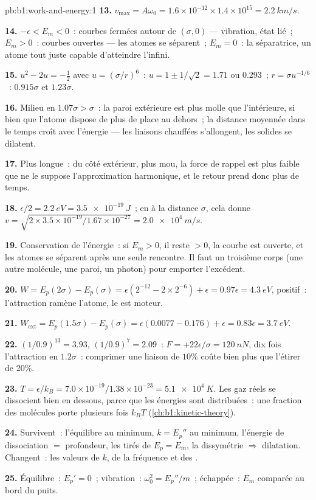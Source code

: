 \begin{solution}{pb:b1:work-and-energy:1}
\textbf{13.} $v_{\max} = A\omega_0 = 1.6\times10^{-12} \times 1.4\times10^{15}
= \qty{2.2}{km/s}$.

\textbf{14.} $-\epsilon < E_m < 0$~: courbes fermées autour de $(\sigma, 0)$ ---
vibration, état lié~; $E_m > 0$~: courbes ouvertes --- les atomes se
séparent~; $E_m = 0$~: la séparatrice, un atome tout juste capable
d'atteindre l'infini.

\textbf{15.} $u^2 - 2u = -\tfrac12$ avec $u = (\sigma/r)^6$~: $u = 1 \pm 1/\sqrt2
= 1.71$ ou $0.293$~; $r = \sigma u^{-1/6}$~: $0.915\sigma$ et $1.23\sigma$.

\textbf{16.} Milieu en $1.07\sigma > \sigma$~: la paroi extérieure est plus
molle que l'intérieure, si bien que l'atome dispose de plus de place au
dehors~; la distance moyennée dans le temps croît avec l'énergie --- les
liaisons chauffées s'allongent, les solides se dilatent.

\textbf{17.} Plus longue~: du côté extérieur, plus mou, la force de
rappel est plus faible que ne le suppose l'approximation harmonique, et
le retour prend donc plus de temps.

\textbf{18.} $\epsilon/2 = \qty{2.2}{eV} = \qty{3.5e-19}{J}$~; en
 à la distance $\sigma$, cela donne
$v = \sqrt{2 \times 3.5\times10^{-19}/1.67\times10^{-27}}
= \qty{2.0e4}{m/s}$.

\textbf{19.} Conservation de l'énergie~: si $E_m > 0$, il reste $> 0$, la
courbe est ouverte, et les atomes se séparent après une seule rencontre.
Il faut un troisième corps (une autre molécule, une paroi, un photon)
pour emporter l'excédent.

\textbf{20.} $W = E_p(2\sigma) - E_p(\sigma) = \epsilon(2^{-12} - 2 \times 2^{-6})
+ \epsilon = 0.97\epsilon = \qty{4.3}{eV}$, positif~: l'attraction ramène
l'atome, le  est moteur.

\textbf{21.} $W_{\text{ext}} = E_p(1.5\sigma) - E_p(\sigma) = \epsilon(0.0077 -
0.176) + \epsilon = 0.83\epsilon = \qty{3.7}{eV}$.

\textbf{22.} $(1/0.9)^{13} = 3.93$, $(1/0.9)^7 = 2.09$~: $F = +22\epsilon/\sigma
= \qty{+120}{nN}$, dix fois l'attraction en $1.2\sigma$~: comprimer une
liaison de $10\%$ coûte bien plus que l'étirer de $20\%$.

\textbf{23.} $T = \epsilon/k_B = 7.0\times10^{-19}/1.38\times10^{-23} =
\qty{5.1e4}{K}$. Les gaz réels se dissocient bien en dessous, parce que
les énergies sont distribuées~: une fraction des molécules porte
plusieurs fois $k_BT$ (\cref{ch:b1:kinetic-theory}).

\textbf{24.} Survivent~: l'équilibre au minimum, $k = E_p''$ au minimum,
l'énergie de dissociation $=$ profondeur, les 
tirés de $E_p = E_m$, la dissymétrie $\Rightarrow$ dilatation. Changent~:
les valeurs de $k$, de la fréquence et des .

\textbf{25.} Équilibre~: $E_p' = 0$~; vibration~: $\omega_0^2 = E_p''/m$~;
échappée~: $E_m$ comparée au bord du puits.
\end{solution}
